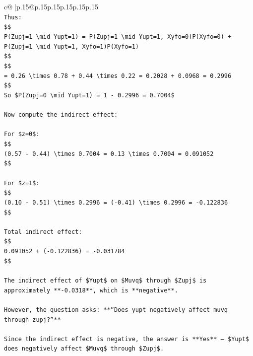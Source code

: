 \documentclass{article}
\begin{document}
{\begin{supertabular}{c@{$\;$}|p{.15\linewidth}@{}p{.15\linewidth}p{.15\linewidth}p{.15\linewidth}p{.15\linewidth}p{.15\linewidth}}
{{{\\ 
\texttt{Thus:} \\
\texttt{\$\$} \\
\texttt{P(Zupj=1 \textbackslash{}mid Yupt=1) = P(Zupj=1 \textbackslash{}mid Yupt=1, Xyfo=0)P(Xyfo=0) + P(Zupj=1 \textbackslash{}mid Yupt=1, Xyfo=1)P(Xyfo=1)} \\
\texttt{\$\$} \\
\texttt{\$\$} \\
\texttt{= 0.26 \textbackslash{}times 0.78 + 0.44 \textbackslash{}times 0.22 = 0.2028 + 0.0968 = 0.2996} \\
\texttt{\$\$} \\
\texttt{So \$P(Zupj=0 \textbackslash{}mid Yupt=1) = 1 {-} 0.2996 = 0.7004\$} \\
\\ 
\texttt{Now compute the indirect effect:} \\
\\ 
\texttt{For \$z=0\$:} \\
\texttt{\$\$} \\
\texttt{(0.57 {-} 0.44) \textbackslash{}times 0.7004 = 0.13 \textbackslash{}times 0.7004 = 0.091052} \\
\texttt{\$\$} \\
\\ 
\texttt{For \$z=1\$:} \\
\texttt{\$\$} \\
\texttt{(0.10 {-} 0.51) \textbackslash{}times 0.2996 = ({-}0.41) \textbackslash{}times 0.2996 = {-}0.122836} \\
\texttt{\$\$} \\
\\ 
\texttt{Total indirect effect:} \\
\texttt{\$\$} \\
\texttt{0.091052 + ({-}0.122836) = {-}0.031784} \\
\texttt{\$\$} \\
\\ 
\texttt{The indirect effect of \$Yupt\$ on \$Muvq\$ through \$Zupj\$ is approximately **{-}0.0318**, which is **negative**.} \\
\\ 
\texttt{However, the question asks: **“Does yupt negatively affect muvq through zupj?”**} \\
\\ 
\texttt{Since the indirect effect is negative, the answer is **Yes** — \$Yupt\$ does negatively affect \$Muvq\$ through \$Zupj\$.} \\
}}}
\end{supertabular}}
\end{document}
